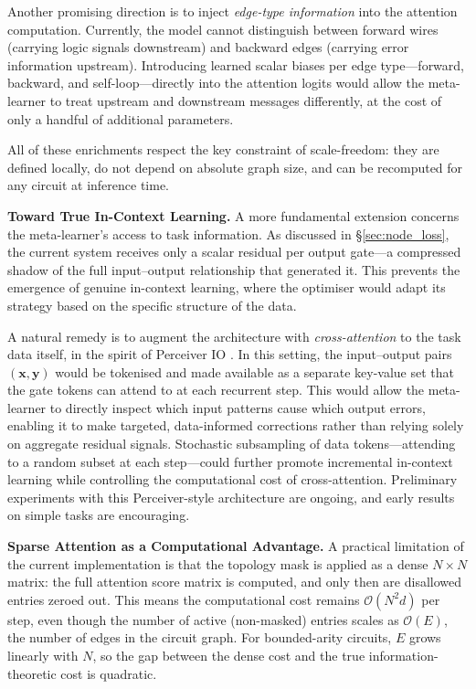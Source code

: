 Another promising direction is to inject \textit{edge-type information} into the attention computation. Currently, the model cannot distinguish between forward wires (carrying logic signals downstream) and backward edges (carrying error information upstream). Introducing learned scalar biases per edge type---forward, backward, and self-loop---directly into the attention logits would allow the meta-learner to treat upstream and downstream messages differently, at the cost of only a handful of additional parameters.

All of these enrichments respect the key constraint of scale-freedom: they are defined locally, do not depend on absolute graph size, and can be recomputed for any circuit at inference time.

\textbf{Toward True In-Context Learning.}
A more fundamental extension concerns the meta-learner's access to task information. As discussed in \S\ref{sec:node_loss}, the current system receives only a scalar residual per output gate---a compressed shadow of the full input--output relationship that generated it. This prevents the emergence of genuine in-context learning, where the optimiser would adapt its strategy based on the specific structure of the data.

A natural remedy is to augment the architecture with \textit{cross-attention} to the task data itself, in the spirit of Perceiver IO \citep{jaegle2022perceiveriogeneralarchitecture}. In this setting, the input--output pairs $(\mathbf{x}, \mathbf{y})$ would be tokenised and made available as a separate key-value set that the gate tokens can attend to at each recurrent step. This would allow the meta-learner to directly inspect which input patterns cause which output errors, enabling it to make targeted, data-informed corrections rather than relying solely on aggregate residual signals. Stochastic subsampling of data tokens---attending to a random subset at each step---could further promote incremental in-context learning while controlling the computational cost of cross-attention. Preliminary experiments with this Perceiver-style architecture are ongoing, and early results on simple tasks are encouraging.


\textbf{Sparse Attention as a Computational Advantage.}
A practical limitation of the current implementation is that the topology mask is applied as a dense $N \times N$ matrix: the full attention score matrix is computed, and only then are disallowed entries zeroed out. This means the computational cost remains $\mathcal{O}(N^2 d)$ per step, even though the number of active (non-masked) entries scales as $\mathcal{O}(E)$, the number of edges in the circuit graph. For bounded-arity circuits, $E$ grows linearly with $N$, so the gap between the dense cost and the true information-theoretic cost is quadratic.

